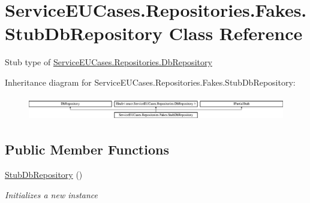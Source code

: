 \hypertarget{class_service_e_u_cases_1_1_repositories_1_1_fakes_1_1_stub_db_repository}{\section{Service\-E\-U\-Cases.\-Repositories.\-Fakes.\-Stub\-Db\-Repository Class Reference}
\label{class_service_e_u_cases_1_1_repositories_1_1_fakes_1_1_stub_db_repository}
}


Stub type of \hyperlink{class_service_e_u_cases_1_1_repositories_1_1_db_repository}{Service\-E\-U\-Cases.\-Repositories.\-Db\-Repository} 


Inheritance diagram for Service\-E\-U\-Cases.\-Repositories.\-Fakes.\-Stub\-Db\-Repository\-:\begin{figure}[H]
\begin{center}
\leavevmode
\includegraphics[height=1.048689cm]{class_service_e_u_cases_1_1_repositories_1_1_fakes_1_1_stub_db_repository}
\end{center}
\end{figure}
\subsection*{Public Member Functions}
\begin{DoxyCompactItemize}
\item 
\hyperlink{class_service_e_u_cases_1_1_repositories_1_1_fakes_1_1_stub_db_repository_a1e9ee4b90fc604954fa7db3fcbef6598}{Stub\-Db\-Repository} ()
\begin{DoxyCompactList}\small\item\em Initializes a new instance\end{DoxyCompactList}\end{DoxyCompactItemize}
